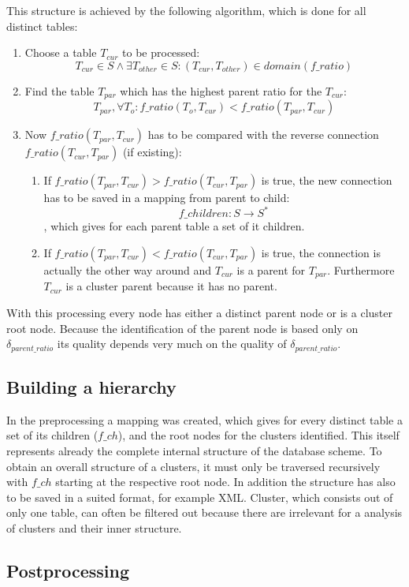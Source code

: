 \documentclass[10pt, journal, twocolumn]{IEEEtran}
\begin{document}
This structure is achieved by the following algorithm, which is done for all distinct tables: \begin{enumerate}
\item Choose a table $T_{cur}$ to be processed: $$T_{cur} \in S \wedge \exists T_{other} \in S: (T_{cur}, T_{other}) \in domain(f\_ratio)$$
\item Find the table $T_{par}$ which has the highest parent ratio for the $T_{cur}$: $$T_{par}, \forall T_{o}: f\_ratio(T_o, T_{cur}) < f\_ratio(T_{par},T_{cur}) $$
\item Now $f\_ratio(T_{par},T_{cur})$ has to be compared with the reverse connection $f\_ratio(T_{cur},T_{par})$ (if existing):
\begin{enumerate}
\item If $f\_ratio(T_{par},T_{cur}) > f\_ratio(T_{cur},T_{par})$ is true, the new connection has to be saved in a mapping from parent to child: $$f\_children: S \rightarrow S^*$$, which gives for each parent table a set of it children.
\item If $f\_ratio(T_{par},T_{cur}) < f\_ratio(T_{cur},T_{par})$ is true, the connection is actually the other way around and $T_{cur}$ is a parent for $T_{par}$. Furthermore $T_{cur}$ is a cluster parent because it has no parent.
\end{enumerate}
\end{enumerate}
With this processing every node has either a distinct parent node or is a cluster root node. Because the identification of the parent node is based only on $\delta_{parent\_ratio}$ its quality depends very much on the quality of $\delta_{parent\_ratio}$. 
\\\subsection{Building a hierarchy}
In the preprocessing a mapping was created, which gives for every distinct table a set of its children ($f\_ch$), and the root nodes for the clusters identified. This itself represents already the complete internal structure of the database scheme. To obtain an overall structure of a clusters, it must only be traversed recursively with $f\_ch$ starting at the respective root node. In addition the structure has also to be saved in a suited format, for example XML. Cluster, which consists out of only one table, can often be filtered out because there are irrelevant for a analysis of clusters and their inner structure. 
\\\subsection{Postprocessing}
\end{document}
